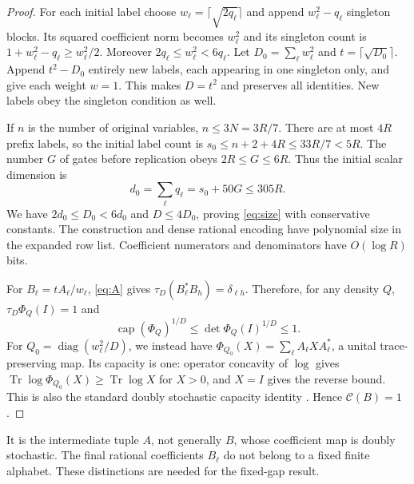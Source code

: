 \documentclass[11pt,a4paper]{article}
\newcommand{\Tr}{\operatorname{Tr}}
\newcommand{\capop}{\operatorname{cap}}
\newcommand{\K}{\mathcal C}
\begin{document}
\begin{proof}
For each initial label choose $w_\ell=\lceil\sqrt{2q_\ell}\rceil$ and append $w_\ell^2-q_\ell$ singleton blocks. Its squared coefficient norm becomes $w_\ell^2$ and its singleton count is $1+w_\ell^2-q_\ell\ge w_\ell^2/2$. Moreover $2q_\ell\le w_\ell^2<6q_\ell$. Let $D_0=\sum_\ell w_\ell^2$ and $t=\lceil\sqrt{D_0}\rceil$. Append $t^2-D_0$ entirely new labels, each appearing in one singleton only, and give each weight $w=1$. This makes $D=t^2$ and preserves all identities. New labels obey the singleton condition as well.

If $n$ is the number of original variables, $n\le3N=3R/7$. There are at most $4R$ prefix labels, so the initial label count is
$s_0\le n+2+4R\le33R/7<5R$. The number $G$ of gates before replication obeys $2R\le G\le6R$. Thus the initial scalar dimension is
\[
 d_0=\sum_\ell q_\ell=s_0+50G\le305R.
\]
We have $2d_0\le D_0<6d_0$ and $D\le4D_0$, proving \eqref{eq:size} with conservative constants. The construction and dense rational encoding have polynomial size in the expanded row list. Coefficient numerators and denominators have $O(\log R)$ bits.

For $B_\ell=tA_\ell/w_\ell$, \eqref{eq:A} gives $\tau_D(B_\ell^*B_h)=\delta_{\ell h}$. Therefore, for any density $Q$,
$\tau_D\Phi_Q(I)=1$ and
\[
 \capop(\Phi_Q)^{1/D}\le\det\Phi_Q(I)^{1/D}\le1.
\]
For $Q_0=\operatorname{diag}(w_\ell^2/D)$, we instead have
$\Phi_{Q_0}(X)=\sum_\ell A_\ell XA_\ell^*$, a unital trace-preserving map. Its capacity is one: operator concavity of $\log$ gives
$\Tr\log\Phi_{Q_0}(X)\ge\Tr\log X$ for $X>0$, and $X=I$ gives the reverse bound. This is also the standard doubly stochastic capacity identity \cite{ggow}. Hence $\K(B)=1$.
\end{proof}

It is the intermediate tuple $A$, not generally $B$, whose coefficient map is doubly stochastic. The final rational coefficients $B_\ell$ do not belong to a fixed finite alphabet. These distinctions are needed for the fixed-gap result.
\end{document}
